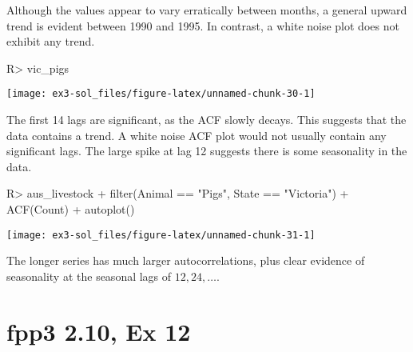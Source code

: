 \documentclass[
]{article}
\begin{document}
Although the values appear to vary erratically between months, a general upward trend is evident between 1990 and 1995. In contrast, a white noise plot does not exhibit any trend.

\begin{CodeChunk}
\begin{CodeInput}
R> vic_pigs %
\end{CodeInput}


\begin{center}\texttt{[image: ex3-sol\_files/figure-latex/unnamed-chunk-30-1]} \end{center}

\end{CodeChunk}

The first 14 lags are significant, as the ACF slowly decays. This suggests that the data contains a trend. A white noise ACF plot would not usually contain any significant lags. The large spike at lag 12 suggests there is some seasonality in the data.

\begin{CodeChunk}
\begin{CodeInput}
R> aus_livestock %
+   filter(Animal == "Pigs", State == "Victoria") %
+   ACF(Count) %
+   autoplot()
\end{CodeInput}


\begin{center}\texttt{[image: ex3-sol\_files/figure-latex/unnamed-chunk-31-1]} \end{center}

\end{CodeChunk}

The longer series has much larger autocorrelations, plus clear evidence of seasonality at the seasonal lags of \(12, 24, \dots\).

\hypertarget{fpp3-2.10-ex-12}{%
\section{fpp3 2.10, Ex 12}\label{fpp3-2.10-ex-12}}
\end{document}
